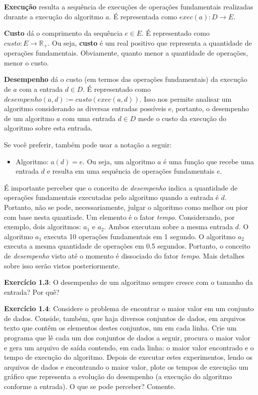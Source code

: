 \documentclass{article}
\begin{document}
\textbf{Execução} resulta a sequência de execuções de operações
fundamentais realizadas durante a execução do algoritmo \(a\). É
representada como \(exec(a) : D \rightarrow E\).

\textbf{Custo} dá o comprimento da sequência \(e \in E\). É representado
como \(custo : E \rightarrow \mathbb{R}_+\). Ou seja, \textbf{custo} é
um real positivo que representa a quantidade de operações fundamentais.
Obviamente, quanto menor a quantidade de operações, menor o custo.

\textbf{Desempenho} dá o custo (em termos das operações fundamentais) da
execução de \(a\) com a entrada \(d \in D\). É representado como
\(desempenho(a, d) := custo( exec(a, d) )\). Isso nos permite analisar
um algoritmo considerando as diversas entradas possíveis e, portanto, o
desempenho de um algoritmo \(a\) com uma entrada \(d \in D\) mede o
custo da execução do algoritmo sobre esta entrada.

Se você preferir, também pode usar a notação a seguir:

\begin{itemize}
\itemsep1pt\parskip0pt
\item
  Algoritmo: \(a(d) = e\). Ou seja, um algoritmo \(a\) é uma função que
  recebe uma entrada \(d\) e resulta em uma sequência de operações
  fundamentais \(e\).
\end{itemize}

É importante perceber que o conceito de \emph{desempenho} indica a
quantidade de operações fundamentais executadas pelo algoritmo quando a
entrada é \(d\). Portanto, não se pode, necessariamente, julgar o
algoritmo como melhor ou pior com base nesta quantiade. Um elemento é o
fator \emph{tempo}. Considerando, por exemplo, dois algoritmos: \(a_1\)
e \(a_2\). Ambos executam sobre a mesma entrada \(d\). O algoritmo
\(a_1\) executa 10 operações fundamentais em 1 segundo. O algoritmo
\(a_2\) executa a mesma quantidade de operações em 0.5 segundos.
Portanto, o conceito de \emph{desempenho} visto até o momento é
dissociado do fator \emph{tempo}. Mais detalhes sobre isso serão vistos
posteriormente.

\textbf{Exercício 1.3}: O desempenho de um algoritmo sempre cresce com o
tamanho da entrada? Por quê?

\textbf{Exercício 1.4}: Considere o problema de encontrar o maior valor
em um conjunto de dados. Conside, também, que haja diversos conjuntos de
dados, em arquivos texto que contêm os elementos destes conjuntos, um em
cada linha. Crie um programa que lê cada um dos conjuntos de dados a
seguir, procura o maior valor e gera um arquivo de saída contendo, em
cada linha: o maior valor encontrado e o tempo de execução do algoritmo.
Depois de executar estes experimentos, lendo os arquivos de dados e
encontrando o maior valor, plote os tempos de execução um gráfico que
representa a evolução do desempenho (a execução do algoritmo conforme a
entrada). O que se pode perceber? Comente.
\end{document}

